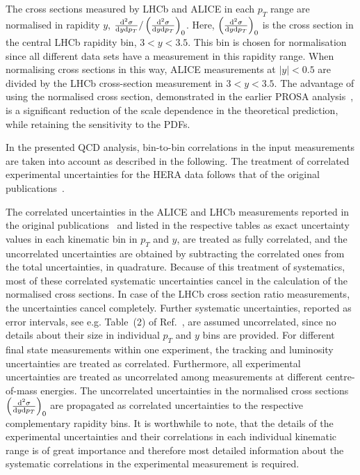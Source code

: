 The cross sections measured by LHCb and ALICE in each $p_T$ range are normalised in rapidity $y$, $\frac{{\rm d}^2\sigma}{{\rm d}y{\rm d}p_T} / \left(\frac{{\rm d}^2\sigma}{{\rm d}y{\rm d}p_T}\right)_{0}$. Here, $\left(\frac{{\rm d}^2\sigma}{{\rm d}y{\rm d}p_T}\right)_{0}$ is the cross section in the central LHCb rapidity bin, $3 < y < 3.5$. 
{\color{blue}This bin is chosen for normalisation since all different data sets have a measurement in this rapidity range.}
When normalising cross sections in this way, ALICE measurements at $|y| < 0.5$ are divided by the LHCb cross-section measurement in $3 < y < 3.5$.
The advantage of using the normalised cross section, demonstrated in the earlier PROSA analysis~\cite{Zenaiev:2015rfa}, 
is a significant reduction of the scale dependence in the theoretical prediction,  while retaining the sensitivity to 
the PDFs. 

In the presented QCD analysis, bin-to-bin correlations in the input measurements are taken into account as described in the following. The treatment of correlated experimental uncertainties for the HERA data follows that of the original publications~\cite{Abramowicz:2015mha,H1:2018flt}.
 
The correlated uncertainties in the ALICE and LHCb measurements reported in the original publications~\cite{Aaij:2016jht, Aaij:2013mga, Aaij:2015bpa, Acharya:2019mgn, Acharya:2017jgo, Aaij:2013noa} and listed in the respective tables as exact uncertainty values in each kinematic bin in $p_T$ and $y$, 
are treated as fully correlated, and the uncorrelated uncertainties are obtained by subtracting the correlated ones from the 
total uncertainties, in quadrature. Because of this treatment of systematics, most of these correlated systematic uncertainties cancel in the calculation of the normalised cross sections. In case of the LHCb cross section ratio measurements, the uncertainties cancel completely. Further systematic uncertainties, reported as error intervals, see e.g. Table~(2) of Ref.~\cite{Aaij:2016jht}, are assumed uncorrelated, since no details about their size in individual $p_T$ and $y$ bins are provided. 
For different final state measurements within one experiment, the tracking and luminosity uncertainties are treated as correlated. 
Furthermore, all experimental uncertainties are treated as uncorrelated among measurements at different centre-of-mass energies. 
The uncorrelated uncertainties in the normalised cross sections $\left(\frac{{\rm d}^2\sigma}{{\rm d}y{\rm d}p_T}\right)_{0}$ are propagated as correlated uncertainties to the respective complementary rapidity bins.
It is worthwhile to note, that the details of the experimental uncertainties and their correlations in each individual kinematic range is of great importance and therefore most detailed information about the systematic correlations in the experimental measurement is required.

